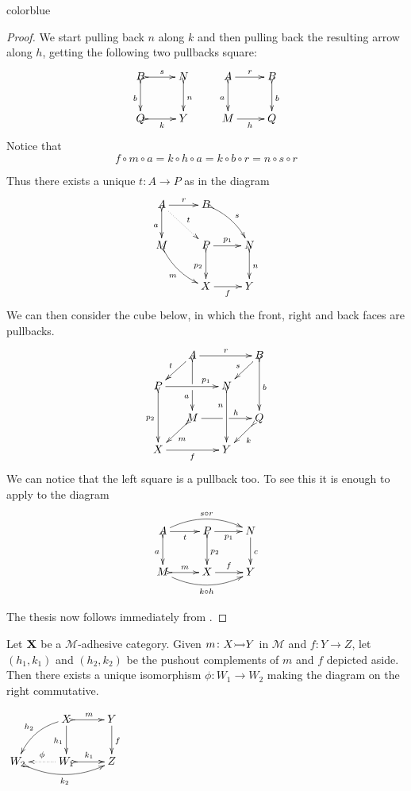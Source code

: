\documentclass[a4paper,UKenglish,cleveref,pdftex, thm-restate,numberwithinsect,anonymous]{lipics}
\newcommand{\full}[1]{{color{blue}#1}}
\newcommand{\full}[1]{}
\newcommand{\mto}[0]{\scalebox{1}{$\rightarrowtail$}}
\def\X{\textbf {\textup{X}}}
\begin{document}
\full{ 
\begin{proof}
	We start pulling back $n$ along $k$ and then pulling back the resulting arrow along $h$, getting the following two pullbacks square:
	\[\xymatrix{B \ar@{>->}[d]_{b}\ar@{>->}[r]^{s}& N \ar@{>->}[d]^{n} & A \ar[r]^{r} \ar@{>->}[d]_{a}& B \ar@{>->}[d]^{b}\\Q\ar@{>->}[r]_{k}&Y &M \ar[r]_h&Q\\}\]
	Notice that
	\[
		f\circ m\circ a=k\circ h\circ a=k\circ b\circ r=n\circ s\circ r\]

	Thus there exists a unique $t\colon A\to P$ as in the diagram
	\[\xymatrix{A \ar@{>->}[d]_{a} \ar@{.>}[dr]^{t}\ar[r]^{r} &B \ar@{>->}@/^.2cm/[dr]^{s} \\ M \ar@{>->}@/_.2cm/[dr]_{m}&P\ar[r]^{p_1}  \ar@{>->}[d]_{p_2}& N \ar@{>->}[d]^{n}\\ &X \ar[r]_{f} & Y}\]
	We can then consider the cube below, in which the front, right and back faces are pullbacks.
	\[\xymatrix@C=15pt@R=15pt{&A\ar@{>->}[dd]|\hole_(.65){a}\ar[rr]^{r} \ar[dl]_{t} && B \ar@{>->}[dd]^{b} \ar[dl]_{s} \\ P  \ar@{>->}[dd]_{p_2}\ar[rr]^(.7){p_1} & & N \ar@{>->}[dd]_(.3){n}\\&M\ar[rr]|\hole^(.65){h} \ar@{>->}[dl]^{m} && Q \ar@{>->}[dl]^{k} \\X \ar[rr]_{f} & & Y}\]
	We can notice that the left square is a pullback too. To see this it is enough to apply \Cref{lem:pb1} to the diagram
	\[\xymatrix{A  \ar@/^.4cm/[rr]^{s\circ r}\ar@{>->}[d]_{a} \ar[r]_{t}& \ar[r]_{p_1} P \ar@{>->}[d]^{p_2}& N \ar[d]^{c}\\ M \ar@/_.4cm/[rr]_{k\circ h}\ar@{>->}[r]^{m}& X \ar[r]^{f}& Y}\]

	The thesis now follows immediately from \Cref{lem:varie}. \qedhere
\end{proof}
}
\noindent
\parbox{10cm}{
	\begin{corollary}\label{lem:pocomp}
		Let $\X$ be a $\mathcal{M}$-adhesive category. Given $m\colon X\mto Y$ in $\mathcal{M}$ and $f\colon Y\to Z$, let $(h_1, k_1)$ and $(h_2, k_2)$ be the pushout complements of $m$  and $f$ depicted aside. Then there exists a unique isomorphism $\phi\colon W_1\to W_2$ making the diagram on the right commutative.
	\end{corollary}}
\parbox{3cm}{\vspace{1em}$\xymatrix{&X \ar@{>->}[r]^{m} \ar[d]_{h_1} \ar@/_.3cm/[dl]_{h_2}& Y \ar[d]^{f} \\ W_2 \ar@{>->}@/_.4cm/[rr]_{k_2} &W_1 \ar@{.>}[l]_{\phi} \ar@{>->}[r]^{k_1} & Z }$}
\end{document}
